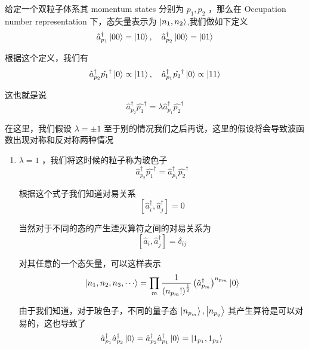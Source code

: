 \begin{example}
    给定一个双粒子体系其 momentum states 分别为 $p_1,p_2$ ，那么在 Occupation number representation 下，态矢量表示为 $\ket{n_1,n_2}$,我们做如下定义
    \begin{equation*}
        \hat{a}_{p_1}^\dagger \ket{00} = \ket{10} ,\quad \hat{a}_{p_2}^\dagger \ket{00} = \ket{01}
    \end{equation*}

    根据这个定义，我们有 
    \begin{equation*}
        \hat{a}_{p_2}^\dagger\hat{p_1}^\dagger \ket{0} \propto \ket{11} ,\quad \hat{a}_{p_1}^\dagger\hat{p_2}^\dagger \ket{0} \propto \ket{11}
    \end{equation*}

    这也就是说 
    \begin{equation*}
        \hat{a}_{p_2}^\dagger\hat{p_1}^\dagger = \lambda \hat{a}_{p_1}^\dagger\hat{p_2}^\dagger
    \end{equation*}

    在这里，我们假设 $\lambda = \pm 1$ 至于别的情况我们之后再说，这里的假设将会导致波函数出现对称和反对称两种情况
    \begin{enumerate}
        \item[case 1] $\lambda = 1$ ，我们将这时候的粒子称为玻色子
        \begin{equation*}
            \hat{a}_{p_2}^\dagger\hat{p_1}^\dagger = \hat{a}_{p_1}^\dagger\hat{p_2}^\dagger
        \end{equation*}

        根据这个式子我们知道对易关系
        \begin{equation*}
            \left[\hat{a}_i^\dagger,\hat{a}_j^\dagger\right] = 0
        \end{equation*}

        当然对于不同的态的产生湮灭算符之间的对易关系为
        \begin{equation*}
            \left[\hat{a}_i,\hat{a}_j^\dagger\right] = \delta_{ij}
        \end{equation*}

        对其任意的一个态矢量，可以这样表示
        \begin{equation*}
            \ket{n_1,n_2,n_3,\cdots} = \prod_m \frac{1}{\left(n_{p_m}!\right)^{\frac{1}{2}}}\left(\hat{a}_{p_m}^\dagger\right)^{n_{p_m}} \ket{0}
        \end{equation*}

        由于我们知道，对于玻色子，不同的量子态 $\ket{n_{p_m}},\ket{n_{p_q}}$ 其产生算符是可以对易的，这也导致了
        \begin{equation*}
            \hat{a}_{p_1}^\dagger \hat{a}_{p_2}^\dagger \ket{0} = \hat{a}_{p_2}^\dagger \hat{a}_{p_1}^\dagger \ket{0} = \ket{1_{p_1},1_{p_2}}
        \end{equation*}


\end{enumerate}
\end{example}
